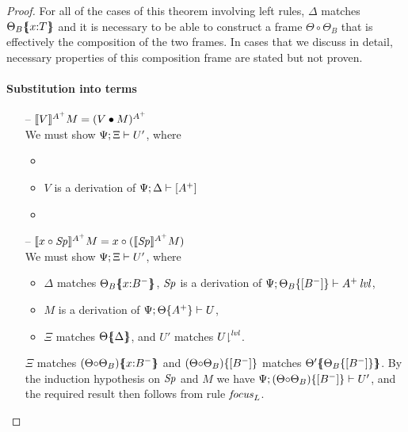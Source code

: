 \begin{proof}
For all of the cases of this theorem involving left rules, $\Delta$
matches $\frameoff{\Theta_B}{x{:}T}$ and it is 
necessary to be able to construct a frame ${\Theta}{\circ}{\Theta_B}$
that is effectively the composition of the two frames. In cases that
we discuss in detail, necessary properties of this composition frame
are stated but not proven.

\paragraph{Substitution into terms}

\begin{itemize}
\item[--] $\lsubsta{\tfocusr{V}}{M}{A^+} = (\subst{V}{M})^{A^+}$\\
  We must show $\foc{\Psi}{\Xi}{U'}$, where
  \begin{itemize}
  \item
  \item $V$ is a derivation of $\foc{\Psi}{\Delta}{[A^+]}$
  \item
  \end{itemize}

\item[--] $\lsubsta{\tfocusl{x}{\Sp}}{M}{A^+}
           = \tfocusl{x}{(\lsubsta{\Sp}{M}{A^+})}$\\
  We must show $\foc{\Psi}{\Xi}{U'}$, where
  \begin{itemize}
  \item $\Delta$ matches $\frameoff{\Theta_B}{x{:}B^-}$, 
    $\Sp$ is a derivation of
    $\foc{\Psi}{\tackon{\Theta_B}{[B^-]}}{\islvl{A^+}}$,
  \item $M$ is a derivation of $\foc{\Psi}{\tackon{\Theta}{A^+}}{U}$,
  \item $\Xi$ matches $\frameoff{\Theta}{\Delta}$, and $U'$ matches 
    $\restrictfrom{U}{\mlvl}$.
  \end{itemize}
  $\Xi$ matches $\frameoff{(\Theta {\circ} \Theta_B)}{x{:}B^-}$
  and $\tackon{(\Theta {\circ} \Theta_B)}{[B^-]}$ matches
  $\frameoff{\Theta'}{\tackon{\Theta_B}{[B^-]}}$. By the induction
  hypothesis on $\Sp$ and $M$ we have 
  $\foc{\Psi}{\tackon{(\Theta {\circ} \Theta_B)}{[B^-]}}{U'}$, and
  the required result then follows from rule ${\it focus}_L$.
  

\end{itemize}
\end{proof}
